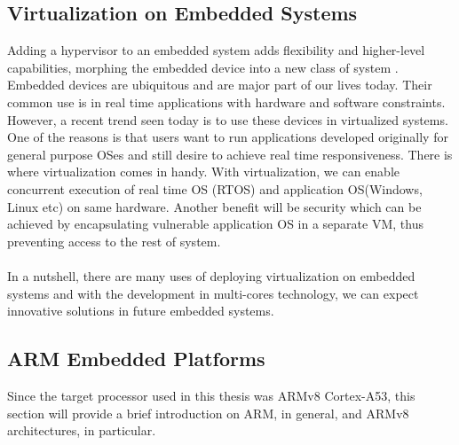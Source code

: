 \subsection{Virtualization on Embedded Systems\label{sec:itu}}
Adding a hypervisor to an embedded system adds flexibility and higher-level capabilities, morphing the embedded device into a new class of system \cite{ibm}. Embedded devices are ubiquitous and are major part of our lives today. Their common use is in real time applications with hardware and software constraints. However, a recent trend seen today is to use these devices in virtualized systems. One of the reasons is that users want to run applications developed originally for general purpose OSes and still desire to achieve real time responsiveness. There is where virtualization comes in handy. With virtualization, we can enable concurrent execution of real time OS (RTOS) and application OS(Windows, Linux etc) on same hardware. Another benefit will be security which can be achieved by encapsulating vulnerable application OS in a separate VM, thus preventing access to the rest of system.
\\
\\
In a nutshell, there are many uses of deploying virtualization on embedded systems and with the development in multi-cores technology, we can expect innovative solutions in future embedded systems. 

\subsection{ARM Embedded Platforms\label{sec:itu}}
Since the target processor used in this thesis was ARMv8 Cortex-A53, this section will provide a brief introduction on ARM, in general, and ARMv8 architectures, in particular.

